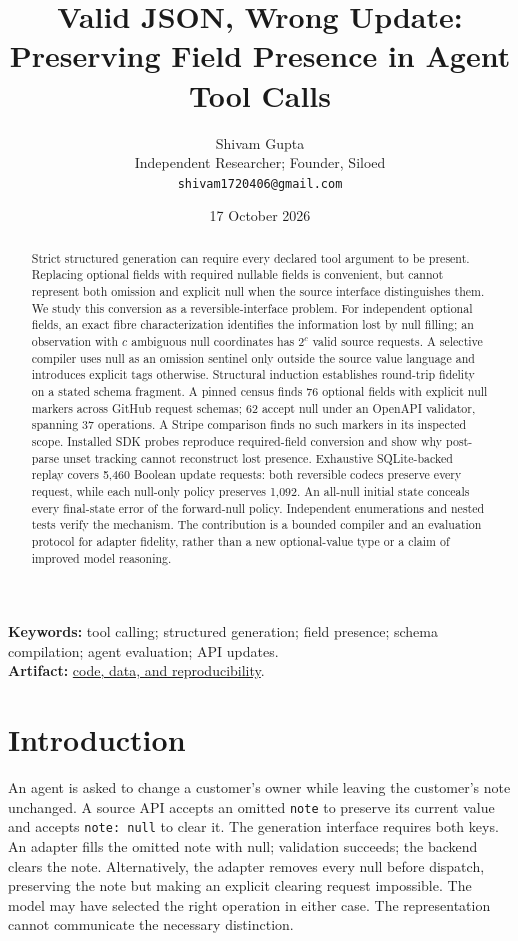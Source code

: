\documentclass[10pt,twocolumn]{article}
\title{Valid JSON, Wrong Update:\\Preserving Field Presence in Agent Tool Calls}
\author{Shivam Gupta\\Independent Researcher; Founder, Siloed\\\small\texttt{shivam1720406@gmail.com}}
\date{17 October 2026}
\begin{document}
\maketitle
\begin{abstract}
Strict structured generation can require every declared tool argument to be present. Replacing optional fields with required nullable fields is convenient, but cannot represent both omission and explicit null when the source interface distinguishes them. We study this conversion as a reversible-interface problem. For independent optional fields, an exact fibre characterization identifies the information lost by null filling; an observation with $c$ ambiguous null coordinates has $2^c$ valid source requests. A selective compiler uses null as an omission sentinel only outside the source value language and introduces explicit tags otherwise. Structural induction establishes round-trip fidelity on a stated schema fragment. A pinned census finds 76 optional fields with explicit null markers across GitHub request schemas; 62 accept null under an OpenAPI validator, spanning 37 operations. A Stripe comparison finds no such markers in its inspected scope. Installed SDK probes reproduce required-field conversion and show why post-parse unset tracking cannot reconstruct lost presence. Exhaustive SQLite-backed replay covers 5,460 Boolean update requests: both reversible codecs preserve every request, while each null-only policy preserves 1,092. An all-null initial state conceals every final-state error of the forward-null policy. Independent enumerations and nested tests verify the mechanism. The contribution is a bounded compiler and an evaluation protocol for adapter fidelity, rather than a new optional-value type or a claim of improved model reasoning.
\end{abstract}
\noindent\textbf{Keywords:} tool calling; structured generation; field presence; schema compilation; agent evaluation; API updates.\\
\textbf{Artifact:} \href{https://github.com/shi1720/presencebridge}{code, data, and reproducibility}.

\section{Introduction}
An agent is asked to change a customer's owner while leaving the customer's note unchanged. A source API accepts an omitted \texttt{note} to preserve its current value and accepts \texttt{note: null} to clear it. The generation interface requires both keys. An adapter fills the omitted note with null; validation succeeds; the backend clears the note. Alternatively, the adapter removes every null before dispatch, preserving the note but making an explicit clearing request impossible. The model may have selected the right operation in either case. The representation cannot communicate the necessary distinction.
\end{document}
